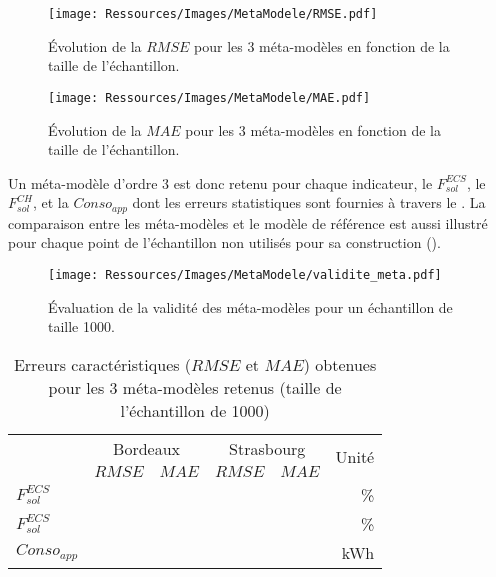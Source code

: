 \begin{figure}
    \centering
    \texttt{[image: Ressources/Images/MetaModele/RMSE.pdf]}
    \caption[Évolution de la $RMSE$ en fonction de l’échantillon]
            {Évolution de la $RMSE$ pour les \num{3} méta-modèles
             en fonction de la taille de l’échantillon.}
    \label{fig:rmse}
\end{figure}

\begin{figure}
    \centering
    \texttt{[image: Ressources/Images/MetaModele/MAE.pdf]}
    \caption[Évolution de la $MAE$ en fonction de l’échantillon]
            {Évolution de la $MAE$ pour les \num{3} méta-modèles
             en fonction de la taille de l’échantillon.}
    \label{fig:mae}
\end{figure}

Un méta-modèle d’ordre \num{3} est donc retenu pour chaque indicateur, le $F_{sol}^{ECS}$, le $F_{sol}^{CH}$,
et la $Conso_{app}$ dont les erreurs statistiques sont fournies à travers le .
La comparaison entre les méta-modèles et le modèle de référence est aussi illustré pour chaque
point de l’échantillon non utilisés pour sa construction ().

\begin{figure}
    \centering
    \texttt{[image: Ressources/Images/MetaModele/validite\_meta.pdf]}
    \caption[Validité des méta-modèles]
            {Évaluation de la validité des méta-modèles pour un échantillon
             de taille \num{1000}.}
    \label{fig:validite_meta}
\end{figure}

\begin{table}
\centering
\caption{Erreurs caractéristiques ($RMSE$ et $MAE$) obtenues pour les \num{3} méta-modèles retenus
         (taille de l’échantillon de \num{1000})
\label{tab:meta_retenus}}
\begin{tabular}{l c c c c r}
    \toprule
                    & \multicolumn{2}{c}{Bordeaux} & \multicolumn{2}{c}{Strasbourg} & \multirow{2}{*}{Unité} \\
                    \cmidrule(r){2-3}
                    \cmidrule(r){4-5}
                    & $RMSE$ & $MAE$               & $RMSE$ & $MAE$                 &                        \\
    \midrule
    $F_{sol}^{ECS}$ &  & & & & \si{\percent} \\
    \addlinespace[\defaultaddspace]
    $F_{sol}^{ECS}$ &  & & & & \si{\percent} \\
    \addlinespace[\defaultaddspace]
    $Conso_{app}$   &  & & & & \si{kWh}      \\
    \bottomrule
\end{tabular}
\end{table}


